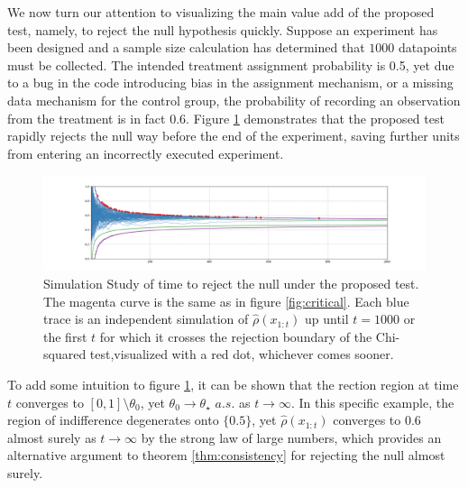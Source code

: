 \documentclass[11pt]{article}
\begin{document}
  We now turn our attention to visualizing the main value add of the proposed test, namely, to reject the null hypothesis quickly.
Suppose an experiment has been designed and a sample size calculation has determined that $1000$ datapoints must be collected.
The intended treatment assignment probability is 0.5, yet due to a bug in the code introducing bias in the assignment mechanism, or a missing data mechanism for the control group, the probability of recording an observation from the treatment is in fact 0.6.
  Figure \ref{fig:ssrm_reject} demonstrates that the proposed test rapidly rejects the null way before the end of the experiment, saving further units from entering an incorrectly executed experiment.
      \begin{figure}[H]
  \centering
  \includegraphics[scale=0.35]{images/ssrm_reject.png}
  \caption{Simulation Study of time to reject the null under the proposed test.
The magenta curve is the same as in figure \ref{fig:critical}.
Each blue trace is an independent simulation of $\hat{\rho}(x_{1:t})$ up until $t=1000$ or the first $t$ for which it crosses the rejection boundary of the Chi-squared test,visualized with a red dot, whichever comes sooner.
}
    \label{fig:ssrm_reject}
  \end{figure}
  \noindent To add some intuition to figure \ref{fig:ssrm_reject}, it can be shown that the rection region at time $t$ converges to $[0,1]\setminus \theta_0$, yet $\theta_0 \rightarrow \theta_\star$ $a.s.$ as $t\rightarrow \infty$.
In this specific example, the region of indifference degenerates onto $\lbrace 0.5 \rbrace$, yet $\hat{\rho}(x_{1:t})$ converges to 0.6 almost surely as $t \rightarrow \infty$ by the strong law of large numbers, which provides an alternative argument to theorem \ref{thm:consistency} for rejecting the null almost surely.
\end{document}
